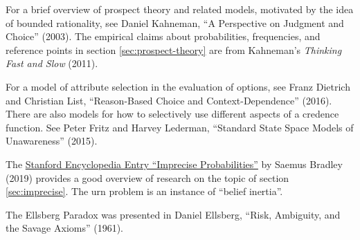 \begin{sources}
  
  For a brief overview of prospect theory and related models, motivated by the
  idea of bounded rationality, see Daniel Kahneman, ``A Perspective on Judgment
  and Choice'' (2003). The empirical claims about probabilities, frequencies,
  and reference points in section \ref{sec:prospect-theory} are from Kahneman's
  \emph{Thinking Fast and Slow} (2011).

  For a model of attribute selection in the evaluation of options, see Franz
  Dietrich and Christian List, ``Reason-Based Choice and Context-Dependence''
  (2016).
  There are also models for how to selectively use different aspects of a
  credence function. See Peter Fritz and Harvey Lederman, ``Standard State Space
  Models of Unawareness'' (2015).

  
  The
  \href{https://plato.stanford.edu/entries/imprecise-probabilities/}{Stanford Encyclopedia Entry ``Imprecise Probabilities''}
  by Saemus Bradley (2019) provides a good overview of research on the topic of
  section \ref{sec:imprecise}. The urn problem is an instance of ``belief
  inertia''.

  The Ellsberg Paradox was presented in Daniel Ellsberg, ``Risk, Ambiguity, and
  the Savage Axioms'' (1961).

\end{sources}




